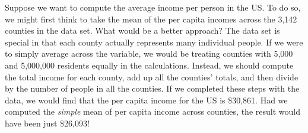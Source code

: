 
\begin{examplewrap}
\begin{nexample}{Suppose we want to compute the average income
    per person in the US.
    To do so, we might first think to take
    the mean of the per capita incomes across the 3,142 counties
    in the  data set.
    What would be a better approach?}
    \label{wtdMeanOfIncome}
  The  data set is special in that each county
  actually represents many individual people.
  If we were to simply average across the 
  variable, we would be treating counties with 5,000 and
  5,000,000 residents equally in the calculations.
  Instead, we should compute the total income for each county,
  add up all the counties' totals, and then divide by the number
  of people in all the counties.
  If we completed these steps with the  data,
  we would find that the per capita income for the US is
  \$30,861.
  Had we computed the \emph{simple} mean of per capita income
  across counties, the result would have been just \$26,093!
\end{nexample}
\end{examplewrap}

